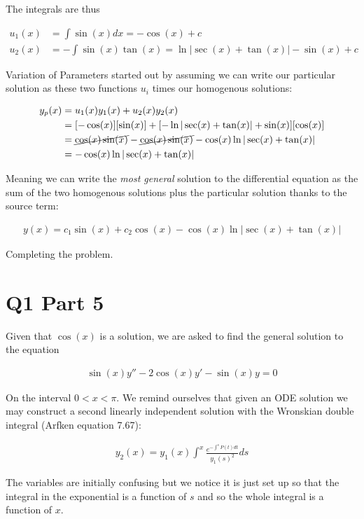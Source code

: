 \documentclass[paper=a4, fontsize=11pt]{scrartcl} %
\numberwithin{equation}{section} %
\numberwithin{figure}{section} %
\numberwithin{table}{section} %
\begin{document}
The integrals are thus 

\begin{align}
u_1(x) &= \int \sin(x) dx = -\cos(x) + c \\
u_2(x) &= -\int \sin(x) \tan(x) = \ln |\sec(x) + \tan(x)| - \sin(x) + c
\end{align}

Variation of Parameters started out by assuming we can write our particular solution as these two functions $u_i$ times our homogenous solutions:


\begin{align}
y_p(x) &= u_1(x)y_1(x) + u_2(x)y_2(x) \\
&= [-\cos(x)][\sin(x)] + [-\ln |\sec(x) + \tan(x)| + \sin(x)][\cos(x)]\\
&= \cancel{\cos(x)\sin(x)} - \cancel{\cos(x)\sin(x)} - \cos(x)\ln|\sec(x) + \tan(x)| \\
&= - \cos(x)\ln|\sec(x) + \tan(x)|
\end{align}

Meaning we can write the \textit{most general} solution to the differential equation as the sum of the two homogenous solutions plus the particular solution thanks to the source term:

\begin{align}
y(x) = c_1 \sin(x) + c_2 \cos(x) - \cos(x)\ln|\sec(x) + \tan(x)|
\end{align}

Completing the problem.

\section{Q1 Part 5}

Given that $\cos(x)$ is a solution, we are asked to find the general solution to the equation

\begin{align}
\sin(x) y'' - 2 \cos(x) y' - \sin(x) y = 0
\end{align}

On the interval $0 < x < \pi$. We remind ourselves that given an ODE solution we may construct a second linearly independent solution with the Wronskian double integral (Arfken equation 7.67):

\begin{align}
y_2(x) = y_1(x) \int^{x} \frac{e^{-\int^{s} P(t) dt}}{y_1(s)^2} ds
\end{align}

The variables are initially confusing but we notice it is just set up so that the integral in the exponential is a function of $s$ and so the whole integral is a function of $x$. 
\end{document}
